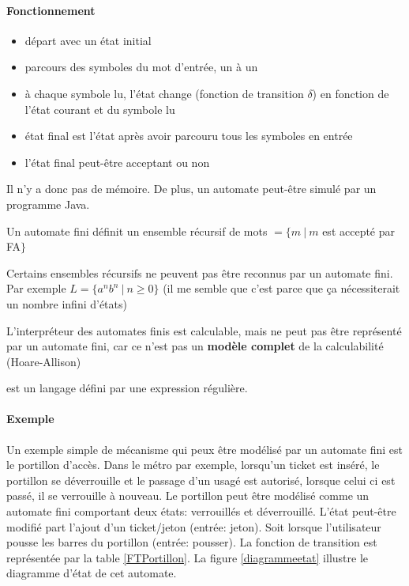 \paragraph{Fonctionnement}
\begin{itemize}
	\item départ avec un état initial
	\item parcours des symboles du mot d'entrée, un à un
	\item à chaque symbole lu, l'état change (fonction de transition
		$\delta$) en fonction de l'état courant et du symbole lu
	\item état final est l'état après avoir parcouru tous les symboles en
		entrée
	\item l'état final peut-être acceptant ou non
\end{itemize}

\begin{myrem}
	Il n'y a donc pas de mémoire. De plus, un automate peut-être simulé
	par un programme Java.
\end{myrem}


\begin{myprop}
	Un automate fini définit un ensemble récursif de mots $=\{m \ |\ m$ est
		accepté par FA$\}$
\end{myprop}

\begin{myprop}
	Certains ensembles récursifs ne peuvent pas être reconnus par un
	automate fini. Par exemple $L = \{ a^n b^n \ | \ n\geq 0\}$ (il me semble que
	c'est parce que ça nécessiterait un nombre infini d'états)
\end{myprop}

\begin{myprop}
	L'interpréteur des automates finis est calculable, mais ne peut pas être
	représenté par un automate fini, car ce n'est pas un \textbf{modèle
	complet} de la calculabilité (Hoare-Allison)
\end{myprop}

\begin{mydef} est un langage défini par une expression
	régulière.
\end{mydef}

\paragraph{Exemple}
Un exemple simple de mécanisme qui peux être modélisé par un automate fini est le portillon d'accès. Dans le métro par exemple, lorsqu'un ticket est inséré, le portillon se déverrouille et le passage d'un usagé est autorisé, lorsque celui ci est passé, il se verrouille à nouveau. Le portillon peut être modélisé comme un automate fini comportant deux états: verrouillés et déverrouillé. L'état peut-être modifié part l'ajout d'un ticket/jeton (entrée: jeton). Soit lorsque l'utilisateur pousse les barres du portillon (entrée: pousser). La fonction de transition est représentée par la table \ref{FTPortillon}. La figure \ref{diagrammeetat} illustre le diagramme d'état de cet automate.

